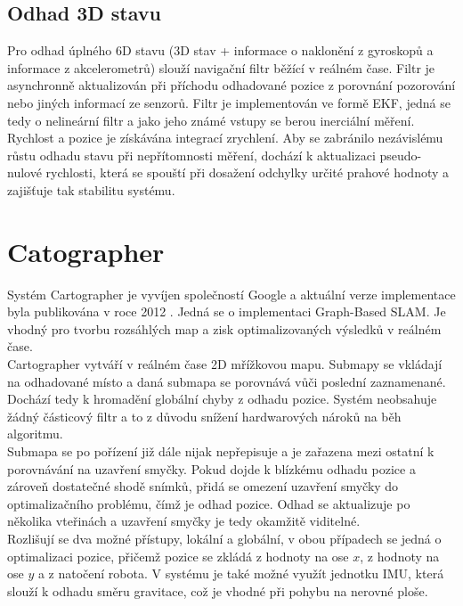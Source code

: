 \documentclass[12pt]{report}
\begin{document}
\subsection{Odhad 3D stavu}
Pro odhad úplného 6D stavu (3D stav + informace o naklonění z gyroskopů a informace z akcelerometrů) slouží navigační filtr běžící v reálném čase. Filtr je asynchronně aktualizován při příchodu odhadované pozice z porovnání pozorování nebo jiných informací ze senzorů. Filtr je implementován ve formě EKF, jedná se tedy o nelineární filtr a jako jeho známé vstupy se berou inerciální měření. Rychlost a pozice je získávána integrací zrychlení. Aby se zabránilo nezávislému růstu odhadu stavu při nepřítomnosti měření, dochází k aktualizaci pseudo-nulové rychlosti, která se spouští při dosažení odchylky určité prahové hodnoty a zajišťuje tak stabilitu systému.\\

\newpage

\section{Catographer}

Systém Cartographer je vyvíjen společností Google a aktuální verze implementace byla publikována v roce 2012 \cite{Hess2016a}. Jedná se o implementaci Graph-Based SLAM. Je vhodný pro tvorbu rozsáhlých map a zisk optimalizovaných výsledků v reálném čase. \\
\indent Cartographer vytváří v reálném čase 2D mřížkovou mapu. Submapy se vkládají na odhadované místo a daná submapa se porovnává vůči poslední zaznamenané. Dochází tedy k hromadění globální chyby z odhadu pozice. Systém neobsahuje žádný částicový filtr a to z důvodu snížení hardwarových nároků na běh algoritmu.\\
\indent Submapa se po pořízení již dále nijak nepřepisuje a je zařazena mezi ostatní k porovnávání na uzavření smyčky. Pokud dojde k blízkému odhadu pozice a zároveň dostatečné shodě snímků, přidá se omezení uzavření smyčky do optimalizačního problému, čímž je odhad pozice. Odhad se aktualizuje po několika vteřinách a uzavření smyčky je tedy okamžitě viditelné.\\
\indent Rozlišují se dva možné přístupy, lokální a globální, v obou případech se jedná o optimalizaci pozice, přičemž pozice se zkládá z hodnoty na ose $x$, z hodnoty na ose $y$ a z natočení robota. V systému je také možné využít jednotku IMU, která slouží k odhadu směru gravitace, což je vhodné při pohybu na nerovné ploše.\\
\end{document}

